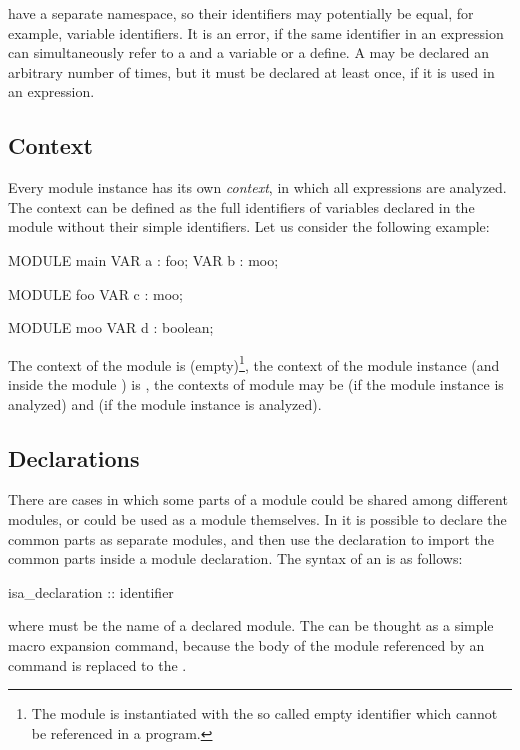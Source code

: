  have a separate namespace, so their
identifiers may potentially be equal, for example, variable
identifiers.
%
It is an error, if the same identifier in an expression can
simultaneously refer to a  and a variable
or a define.
%
A  may be declared an arbitrary number of
times, but it must be declared at least once, if it is used in an
expression.

\subsection{Context}
\label{Context}

Every module instance has its own \emph{context}, in which all
expressions are analyzed.
%
The context can be defined as the full identifiers of variables
declared in the module without their simple identifiers.
%
Let us consider the following example:
%
\begin{nusmvCode}
MODULE main
  VAR a : foo;
  VAR b : moo;

MODULE foo
  VAR c : moo;

MODULE moo
  VAR d : boolean;
\end{nusmvCode}
%
The context of the module  is (empty)\footnote{
The module  is instantiated with the so called empty
identifier which cannot be referenced in a program.}, the context of
the module instance  (and inside the module ) is
, the contexts of module  may be   (if
the module instance  is analyzed) and  (if the
module instance  is analyzed).

\subsection{ Declarations}
\label{ISA Declarations}
%
There are cases in which some parts of a module could be shared among
different modules, or could be used as a module themselves.
%
In \nusmv it is possible to declare the common parts as separate
modules, and then use the  declaration to import the
common parts inside a module declaration.
%
The syntax of an  is as follows:
%
\begin{Grammar}
isa_declaration ::  identifier
\end{Grammar}
%
where  must be the name of a declared module.
%
The  can be thought as a simple macro
expansion command, because the body of the module referenced by an
 command is replaced to the .

